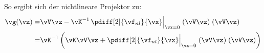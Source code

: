 \documentclass{AMposter}
\begin{document}
\begin{columns}
{	So ergibt sich der nichtlineare Projektor zu:
	\begin{align*}
		\vg(\vz) = & \vV \vz - \vK^{-1}\, \pdiff[2]{\vf_{nl}}{\vx} \Bigr|_{\vx=0} \;(\vV\vz)\;(\vV\vz) \\
		= & \vK^{-1}\left(\vK \vV \vz + \pdiff[2]{\vf_{nl}}{\vx} \Bigr|_{\vx=0} \;(\vV\vz)\;(\vV\vz)\right)
	\end{align*}
}

\end{columns}
\end{document}
